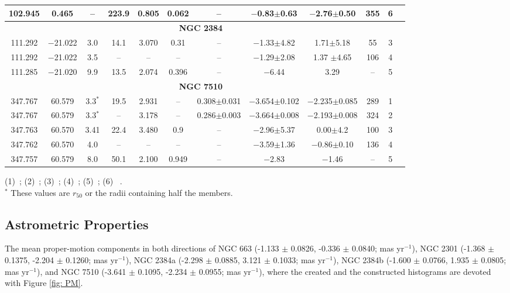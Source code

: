 \documentclass[referee]{raa}            %
\begin{document}
\begin{table}[ht]
\begin{tabular}{cccccccccccc}
102.945 & 0.465 & -- & 223.9 & 0.805 & 0.062 &--& $-$0.83$\pm$0.63 & $-$2.76$\pm$0.50
 & 355 &6 \\
\hline\hline
\multicolumn{11}{c}{\textbf{NGC 2384}}\\
\midrule
111.292 & $-$21.022  & 3.0   & 14.1 & 3.070 &0.31& -- & $-$1.33$\pm$4.82 &  1.71$\pm$5.18& 55 &3 \\
%
111.292 & $-$21.022 & 3.5  & -- & -- & -- &--& $-$1.29$\pm$2.08 & 1.37 $\pm$4.65
 & 106 &4 \\
%
111.285 & $-$21.020 &9.9  & 13.5 & 2.074 & 0.396 &--& $-$6.44& 3.29  & -- &5 \\
\hline\hline
\multicolumn{11}{c}{\textbf{NGC 7510}}\\
\midrule
347.767 & 60.579  & 3.3$^*$   & 19.5 & 2.931 & --& 0.308$\pm$0.031 & $-$3.654$\pm$0.102 &  $-$2.235$\pm$0.085& 289 &1 \\
% 
347.767 &  60.579  & 3.3$^*$ & -- & 3.178 &--& 0.286$\pm$0.003&$-$3.664$\pm$0.008& $-$2.193$\pm$0.008 & 324 & 2 \\
%
%
347.763 &	60.570 & 3.41 &  22.4 & 3.480 &0.9&--& $-$2.96$\pm$5.37  & 0.00$\pm$4.2& 100 &3 \\
%
347.762 & 60.570 & 4.0 &  -- & -- &--&--& $-$3.59$\pm$1.36  &$-$0.86$\pm$0.10& 136 &4\\
%
347.757 & 60.579  & 8.0  & 50.1 & 2.100 & 0.949  &--& $-$2.83 & $-$1.46  & -- &5 \\
\bottomrule
\end{tabular}
\newline
(1)~\cite{Poggio_2021}; (2)~\cite{Cantat_2020}; (3)~\cite{Sampedro2017}; (4)~\cite{Dias2014}; (5)~\cite{Kharchenko2016}; (6) ~\cite{2016A&A...593A.116J}. 
\\$^*$ These values are $r_{50}$ or the radii containing half the members.
\end{table}


\subsection{Astrometric Properties}
\label{sec:astrometric}

The mean proper-motion components in both directions of NGC 663 (-1.133 $\pm$ 0.0826, -0.336 $\pm$ 0.0840; mas yr$^{-1}$), NGC 2301 (-1.368 $\pm$ 0.1375, -2.204 $\pm$ 0.1260; mas yr$^{-1}$), NGC 2384a (-2.298 $\pm$ 0.0885, 3.121 $\pm$ 0.1033; mas yr$^{-1}$), NGC 2384b (-1.600 $\pm$ 0.0766, 1.935 $\pm$ 0.0805; mas yr$^{-1}$), and NGC 7510 (-3.641 $\pm$ 0.1095, -2.234 $\pm$ 0.0955; mas yr$^{-1}$), where the created and the constructed histograms are devoted with Figure \ref{fig: PM}.
\end{document}
